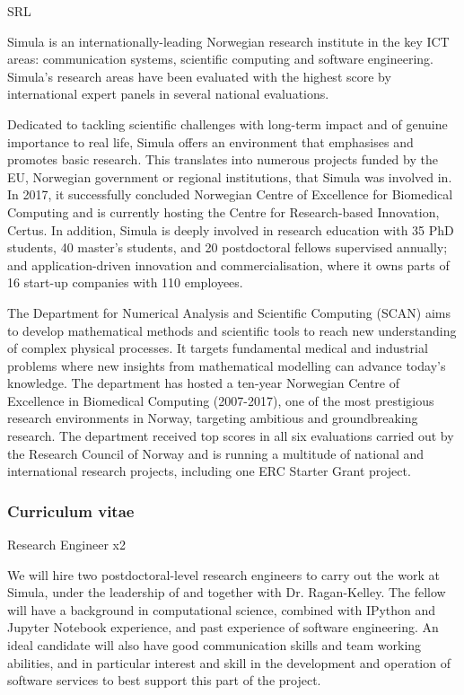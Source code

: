 \begin{sitedescription}{SRL}

Simula is an internationally-leading Norwegian research institute in the key
ICT areas: communication systems, scientific computing and software
engineering. Simula's research areas have been evaluated with the highest
score by international expert panels in several national evaluations.

Dedicated to tackling scientific challenges with long-term impact and of
genuine importance to real life, Simula offers an environment that emphasises
and promotes basic research. This translates into numerous projects funded by
the EU, Norwegian government or regional institutions, that Simula was
involved in. In 2017, it successfully concluded Norwegian Centre of Excellence
for Biomedical Computing and is currently hosting the Centre for
Research-based Innovation, Certus. In addition, Simula is deeply involved in
research education with 35 PhD students, 40 master's students, and 20
postdoctoral fellows supervised annually; and application-driven innovation
and commercialisation, where it owns parts of 16 start-up companies with 110
employees.

The Department for Numerical Analysis and Scientific Computing (SCAN) aims to
develop mathematical methods and scientific tools to reach new understanding
of complex physical processes. It targets fundamental medical and industrial
problems where new insights from mathematical modelling can advance today's
knowledge. The department has hosted a ten-year Norwegian Centre of Excellence
in Biomedical Computing (2007-2017), one of the most prestigious research
environments in Norway, targeting ambitious and groundbreaking research. The
department received top scores in all six evaluations carried out by the
Research Council of Norway and is running a multitude of national and
international research projects, including one ERC Starter Grant project.

\subsubsection*{Curriculum vitae}





\begin{participant}[PM=72, type=R]{Research Engineer x2}

We will hire two postdoctoral-level research engineers to carry out the work
at Simula, under the leadership of and together with Dr. Ragan-Kelley.  The
fellow will have a background in computational science, combined with IPython
and Jupyter Notebook experience, and past experience of software engineering.
An ideal candidate will also have good communication skills and team working
abilities, and in particular interest and skill in the development and
operation of software services to best support this part of the project.


\end{participant}
\end{sitedescription}

